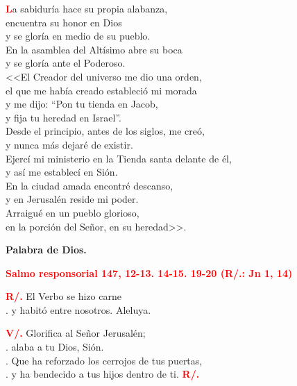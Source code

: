 \documentclass[12pt, letterpaper]{report}
\begin{document}
  \lettrine[lines=2]{\bfseries \textcolor{red}{L}}{}\Large a sabidur\'ia hace su propia alabanza, \\
  encuentra su honor en Dios \\
  y se glor\'ia en medio de su pueblo. \\
  En la asamblea del Alt\'isimo abre su boca \\
  y se glor\'ia ante el Poderoso. \\
  <<El Creador del universo me dio una orden, \\
  el que me hab\'ia creado estableci\'o mi morada \\
  y me dijo: ``Pon tu tienda en Jacob, \\
  y fija tu heredad en Israel''. \\
  Desde el principio, antes de los siglos, me cre\'o, \\
  y nunca m\'as dejar\'e de existir. \\
  Ejerc\'i mi ministerio en la Tienda santa delante de \'el, \\
  y as\'i me establec\'i en Si\'on. \\
  En la ciudad amada encontr\'e descanso, \\
  y en Jerusal\'en reside mi poder. \\
  Arraigu\'e en un pueblo glorioso, \\
  en la porci\'on del Se\~nor, en su heredad>>.

  {\bfseries Palabra de Dios.}
  
  \clearpage

  \Large {\bfseries \textcolor{red}{Salmo responsorial \hspace{1cm} 147, 12-13. 14-15. 19-20 (R/.: Jn 1, 14)}}

  \Large {\bfseries \textcolor{red}{R/.}} \hspace{1cm} El Verbo se hizo carne \\
  . \hspace{2.3cm} y habit\'o entre nosotros. Aleluya.

  {\bfseries \textcolor{red}{V/.}} \hspace{1cm} Glorifica al Se\~nor Jerusal\'en; \\
  . \hspace{2.3cm} alaba a tu Dios, Si\'on. \\
  . \hspace{2.3cm} Que ha reforzado los cerrojos de tus puertas, \\
  . \hspace{2.3cm} y ha bendecido a tus hijos dentro de ti. \hspace{1cm} {\bfseries \textcolor{red}{R/.}}
\end{document}
